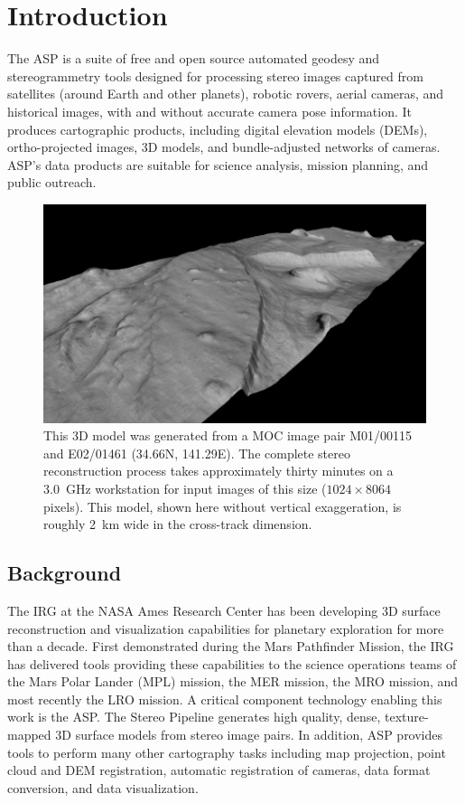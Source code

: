 \chapter{Introduction}

\acresetall

The  \ac{ASP} is a suite of free and open source automated
geodesy and stereogrammetry tools designed for processing stereo images
captured from satellites (around Earth and other planets), robotic
rovers, aerial cameras, and historical images, with and without
accurate camera pose information. It produces cartographic products,
including digital elevation models (DEMs), ortho-projected images, 3D
models, and bundle-adjusted networks of cameras. ASP's data products are
suitable for science analysis, mission planning, and public outreach.

\begin{figure}[tb]
   \centering
   \includegraphics[width=6.5in]{images/introduction/p19view2_400px.png}
   \caption{This 3D model was generated from a \acf{MOC} image
     pair M01/00115 and E02/01461 (34.66N, 141.29E).  The complete
     stereo reconstruction process takes approximately thirty minutes on
     a 3.0~GHz workstation for input images of this size ($1024 \times 8064$
     pixels).  This model, shown here without vertical
     exaggeration, is roughly 2~km wide in the cross-track
     dimension. }
   \label{fig:p19}
\end{figure}

\section{Background}

The \ac{IRG} at the NASA Ames Research Center has been developing
3D surface reconstruction and visualization capabilities for planetary
exploration for more than a decade.  First demonstrated during the
Mars Pathfinder Mission, the \ac{IRG} has delivered tools providing
these capabilities to the science operations teams of the Mars Polar
Lander (MPL) mission, the \ac{MER} mission, the \ac{MRO} mission,
and most recently the \ac{LRO} mission. A critical component
technology enabling this work is the \acf{ASP}.  The Stereo Pipeline
generates high quality, dense, texture-mapped 3D surface models
from stereo image pairs.  In addition, ASP provides tools to
perform many other cartography tasks including map projection,
point cloud and DEM registration, automatic registration of
cameras, data format conversion, and data visualization.

